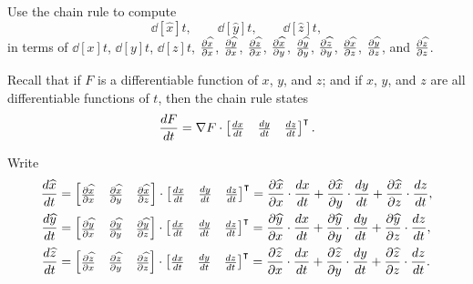 \documentclass[newpage,hints,handout,12pt,noauthor,nooutcomes]{ximera}
\begin{document}
\begin{problem}
  Use the chain rule to compute
  \[
  \dd[\hat x]{t}, \qquad \dd[\hat y]{t}, \qquad \dd[\hat z]{t},
  \]
  in terms of $\dd[x]{t}$, $\dd[y]{t}$, $\dd[z]{t}$, $\pp[\hat x]{x}$, $\pp[\hat y]{x}$, $\pp[\hat z]{x}$,
  $\pp[\hat x]{y}$, $\pp[\hat y]{y}$, $\pp[\hat z]{y}$, $\pp[\hat x]{z}$, $\pp[\hat y]{z}$, and $\pp[\hat z]{z}$. 
  \begin{hint}
    Recall that if $F$ is a differentiable function of $x$, $y$, and
    $z$; and if $x$, $y$, and $z$ are all differentiable functions of
    $t$, then the chain rule states
    \[
    \dd[F]{t} = \nabla F \cdot
    \begin{bmatrix}
      \dd[x]{t} & \dd[y]{t} & \dd[z]{t}
    \end{bmatrix}^\transpose.
    \]
  \end{hint}
  \begin{freeResponse}
    Write
    \begin{align*}
      \dd[\hat x]{t} &= \begin{bmatrix} \pp[\hat x]{x} & \pp[\hat x]{y} & \pp[\hat x]{z} \end{bmatrix} \cdot \begin{bmatrix} \dd[x]{t} & \dd[y]{t} & \dd[z]{t} \end{bmatrix}^\transpose
      = \pp[\hat x]{x}\cdot\dd[x]{t} + \pp[\hat x]{y}\cdot\dd[y]{t} + \pp[\hat x]{z}\cdot\dd[z]{t}, \\
      \dd[\hat y]{t} &= \begin{bmatrix} \pp[\hat y]{x} & \pp[\hat y]{y} & \pp[\hat y]{z} \end{bmatrix} \cdot \begin{bmatrix} \dd[x]{t} & \dd[y]{t} & \dd[z]{t} \end{bmatrix}^\transpose
      = \pp[\hat y]{x}\cdot\dd[x]{t} + \pp[\hat y]{y}\cdot\dd[y]{t} + \pp[\hat y]{z}\cdot\dd[z]{t}, \\
      \dd[\hat z]{t} &= \begin{bmatrix} \pp[\hat z]{x} & \pp[\hat z]{y} & \pp[\hat z]{z} \end{bmatrix} \cdot \begin{bmatrix} \dd[x]{t} & \dd[y]{t} & \dd[z]{t} \end{bmatrix}^\transpose
      = \pp[\hat z]{x}\cdot\dd[x]{t} + \pp[\hat z]{y}\cdot\dd[y]{t} + \pp[\hat z]{z}\cdot\dd[z]{t}.
    \end{align*}
  \end{freeResponse}
\end{problem}
\end{document}
